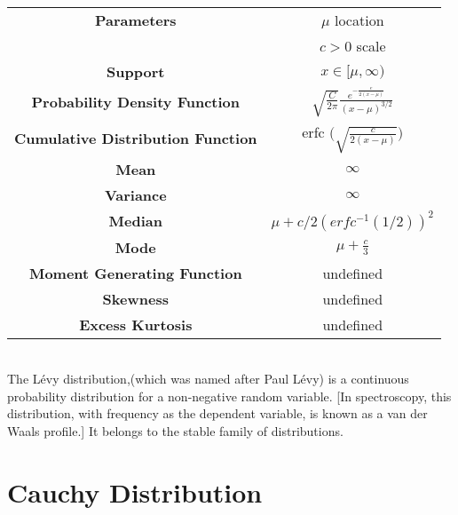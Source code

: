\documentclass[14pt, a4paper]{article}
\theoremstyle{definition}
\begin{document}
\begin{center}
    \begin{tabular}{|c|c|}  %
\hline
 \textbf{Parameters }& $\mu$ location \\ & $c > 0$ scale \\
 \hline
 \textbf{Support} & $ x \in [ \mu, \infty )$ \\
 \hline
 \textbf{Probability Density Function} & $\sqrt{\frac{C}{2\pi}} \frac{e^{- \frac{e}{2(x - \mu)} }}{(x-\mu)^{3/2}}$ \\
 \hline
 \textbf{Cumulative Distribution Function} &  erfc $\Bigg( \sqrt{\frac{c}{2(x - \mu)}} \Bigg)$\\
 \hline
 \textbf{Mean} & $\infty$ \\ 
 \hline
 \textbf{Variance} & $\infty$ \\
 \hline
 \textbf{Median} & $\mu + c/2(erfc^{-1} (1/2))^2$ \\ 
 \hline
 \textbf{Mode} & $\mu + \frac{c}{3}$ \\
 \hline
 \textbf{Moment Generating Function} & undefined \\
 \hline
 \textbf{Skewness} & undefined\\
 \hline
 \textbf{Excess Kurtosis} & undefined \\
 \hline
       
  \end{tabular}
\end{center}

\\ The Lévy distribution,(which was named after Paul Lévy) is a continuous probability distribution for a non-negative random variable. [In spectroscopy, this distribution, with frequency as the dependent variable, is known as a van der Waals profile.] It belongs to the stable family of distributions. 
  
\section{Cauchy Distribution}
\end{document}
